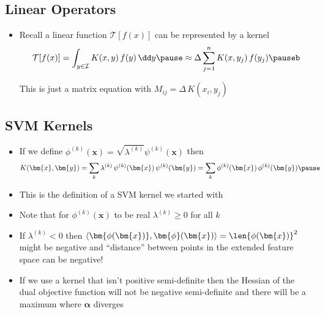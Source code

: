 
\begin{slide}
\section[-2]{Linear Operators}

\begin{PauseHighLight}
  \begin{itemize}\squeeze
  \item Recall a linear function $\mathcal{T}[f(x)]$ can be
    represented by a kernel
    \begin{align*}
      \mathcal{T}[f(x)] = \int_{y\in\mathcal{I}} K(x,y)\,f(y)\,\dd
      y\pause \approx \Delta \sum_{j=1}^n K(x, y_j)\, f(y_j)\pauseb
    \end{align*}
    \begin{center}
      \pauseb
    \end{center}
  This is just a matrix equation with $M_{ij}=\Delta\,K(x_i, y_j)$\pause
  \end{itemize}
\end{PauseHighLight}

\end{slide}



\begin{slide}
\section[-2]{SVM Kernels}

\begin{PauseHighLight}
  \begin{itemize}
  \item If we define $\phi^{(k)}(\bm{x}) = \sqrt{\lambda^{(k)}} \psi^{(k)}(\bm{x})$
    then
    \begin{align*}
      K(\bm{x}, \bm{y}) &= \sum_k \lambda^{(k)}\,
      \psi^{(k)}(\bm{x})\,\psi^{(k)}(\bm{y})
      = \sum_k \phi^{(k)}(\bm{x})\,\phi^{(k)}(\bm{y})\pause
    \end{align*}
  \item This is the definition of a SVM kernel we started with\pause
  \item Note that for $\phi^{(k)}(\bm{x})$ to be real $\lambda^{(k)}\geq 0$ for
    all $k$\pause
  \item If $\lambda^{(k)} < 0$ then $\langle \bm{\phi(\bm{x})},
    \bm{\phi}(\bm{x}) \rangle = \len{\phi(\bm{x})}^2$ might be
    negative and  ``distance'' between points in the
    extended feature space can be negative!\pause
  \item If we use a kernel that isn't positive semi-definite then the
    Hessian of the dual objective function will not be negative
    semi-definite and there will be a maximum where $\bm{\alpha}$
    diverges\pause
  \end{itemize}
\end{PauseHighLight}

\end{slide}



